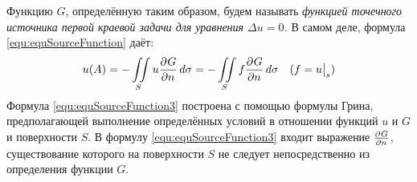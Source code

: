Функцию $G$, определённую таким образом, будем называть \textit{функцией точечного источника первой краевой задачи для уравнения $\Delta u = 0$.} В самом деле, формула \eqref{equ:equSourceFunction} даёт:
\begin{equation}
	u(A) = - \iint\limits_S u \frac{\partial^{}G}{\partial n^{}}\, d\sigma = - \iint\limits_S f \frac{\partial^{}G}{\partial n^{}}\, d\sigma \quad (f = u\big|_s)
	\label{equ:equSourceFunction3}
\end{equation}
Формула \eqref{equ:equSourceFunction3} построена с помощью формулы Грина, предполагающей выполнение определённых условий в отношении функций $u$ и $G$ и поверхности $S$. В формулу  \eqref{equ:equSourceFunction3} входит выражение $\frac{\partial^{}G}{\partial n^{}}$, существование которого на поверхности $S$ не следует непосредственно из определения функции $G$.

%		

